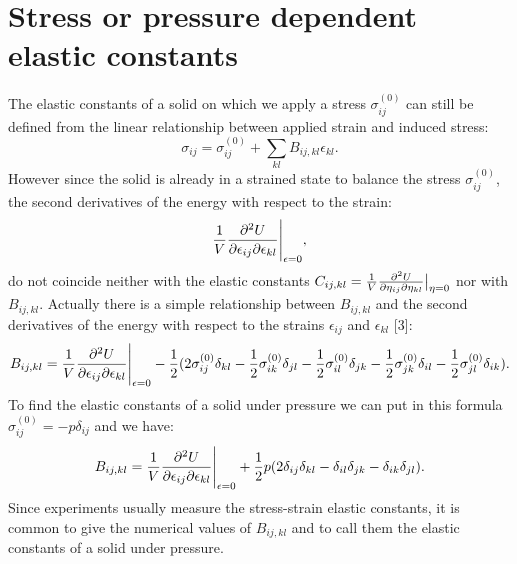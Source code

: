 \documentclass[12pt,a4paper]{article}
\begin{document}
\newpage
\section{\color{coral}Stress or pressure dependent elastic constants}

The elastic constants of a solid on which we apply a stress 
$\sigma^{(0)}_{ij}$ can still
be defined from the linear relationship between applied strain and 
induced stress: 
\begin{equation}
\sigma_{ij} =\sigma^{(0)}_{ij}+\sum_{kl} B_{ij,kl} \epsilon_{kl}.
\end{equation}
However since the solid is already in a strained state
to balance the stress $\sigma^{(0)}_{ij}$, the second derivatives of
the energy with respect to the strain:
\begin{equation}
{1 \over V}{\partial^2 U \over \partial \epsilon_{ij} \partial \epsilon_{kl}}
\Bigg|_{\epsilon=0},
\end{equation}
do not coincide neither with the elastic constants
$C_{ij,kl}={1 \over V}{\partial^2 U \over \partial \eta_{ij} \partial 
\eta_{kl}}\big|_{\eta=0}$ nor with $B_{ij,kl}$. Actually there is a simple 
relationship between $B_{ij,kl}$ and the 
second derivatives of the energy with respect to the strains
$\epsilon_{ij}$ and $\epsilon_{kl}$ [3]:
\begin{equation}
B_{ij,kl} = {1 \over V}{\partial^2 U \over \partial \epsilon_{ij} 
\partial \epsilon_{kl}}\Bigg|_{\epsilon=0} - 
{1\over 2} (2 \sigma^{(0)}_{ij} \delta_{kl} 
-{1\over 2} \sigma^{(0)}_{ik} \delta_{jl} 
-{1\over 2} \sigma^{(0)}_{il} \delta_{jk} 
-{1\over 2} \sigma^{(0)}_{jk} \delta_{il} 
-{1\over 2} \sigma^{(0)}_{jl} \delta_{ik} ).
\label{eqsd2}
\end{equation}
To find the elastic constants of a solid under pressure we can
put in this formula $\sigma^{(0)}_{ij}=-p \delta_{ij}$ and we
have:
\begin{equation}
B_{ij,kl} = {1 \over V}{\partial^2 U \over \partial \epsilon_{ij} 
\partial \epsilon_{kl}}\Bigg|_{\epsilon=0} + 
{1\over 2} p (2 \delta_{ij} \delta_{kl} - 
 \delta_{il} \delta_{jk} - \delta_{ik} \delta_{jl} ).
\end{equation}
Since experiments usually measure the stress-strain elastic constants,
it is common to give the numerical values of $B_{ij,kl}$ and to call them 
the elastic constants of a solid under pressure. 
\end{document}
